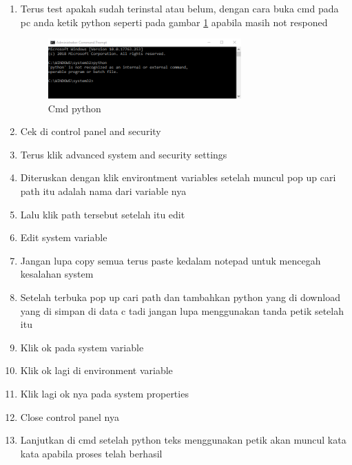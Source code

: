 \begin{enumerate}
\item	Terus test apakah sudah terinstal atau belum, dengan cara buka cmd pada pc anda ketik python seperti pada gambar \ref{cmd_python} apabila masih not responed
\begin{figure}[ht]
	\centerline{\includegraphics[width=0.70\textwidth]{figures/cmd_python.PNG}}
	\caption{Cmd python}
	\label{cmd_python}
\end{figure}
	
\item	Cek di control panel and security
	
\item	Terus klik advanced system and security settings
	
\item	Diteruskan dengan klik environtment variables setelah muncul pop up cari path itu adalah nama dari variable nya
	
\item	Lalu klik path tersebut setelah itu edit
	
\item	Edit system variable
	
\item	Jangan lupa copy semua terus paste kedalam notepad untuk mencegah kesalahan system
	
\item	Setelah terbuka pop up cari path dan tambahkan python yang di download yang di simpan di data c tadi jangan lupa menggunakan tanda petik setelah itu
	
\item	Klik ok pada system variable
\item	Klik ok lagi di environment variable
	
\item	Klik lagi ok nya pada system properties
	
\item	Close control panel nya
	
\item 	Lanjutkan di cmd setelah python teks menggunakan petik akan muncul kata kata apabila proses telah berhasil
\end{enumerate}

